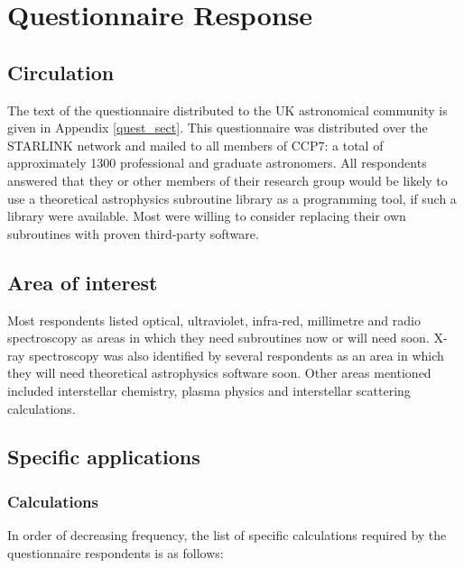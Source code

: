\section {Questionnaire Response}

\subsection {Circulation}
The text of the questionnaire distributed to the UK astronomical
community is given in Appendix \ref{quest_sect}.
This questionnaire was distributed over the STARLINK network and mailed to
all members of CCP7: a total of approximately 1300 professional and graduate
astronomers.
% 
All respondents answered that they or other members of their research group
would be likely to use a theoretical astrophysics subroutine library as a
programming tool, if such a library were available.
Most were willing to consider replacing their own subroutines with
proven third-party software.

\subsection {Area of interest}
Most respondents listed optical, ultraviolet, infra-red, millimetre and
radio spectroscopy as areas in which they need subroutines now or
will need soon.
X-ray spectroscopy was also identified by several respondents as an area
in which they will need theoretical astrophysics software soon.
Other areas mentioned included interstellar chemistry, plasma physics and
interstellar scattering calculations.

\subsection {Specific applications}

\subsubsection {Calculations}
In order of decreasing frequency, the list of specific calculations required
by the questionnaire respondents is as follows:

